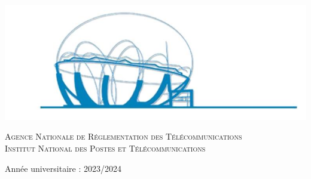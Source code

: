 \begin{center}
\begin{tabular}{p{1cm}lll}
\end{tabular}

\includegraphics[scale=0.65]{Logos/ZLAFA.png}


\textsc{Agence Nationale de Réglementation des Télécommunications}\\
\textsc{Institut National des Postes et Télécommunications}

{\large Année universitaire : 2023/2024}
   
\end{center}


